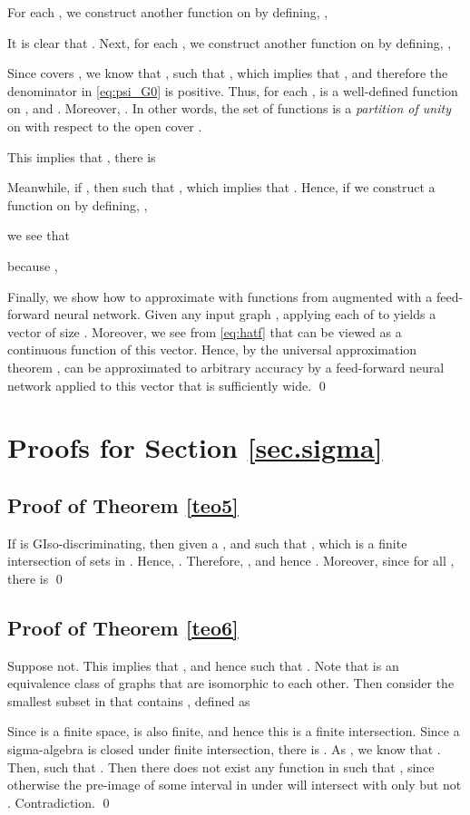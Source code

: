 \documentclass{article}
\begin{document}
For each , we construct another function  on  by defining, ,

It is clear that . Next, for each , we construct another function  on  by defining, ,

Since  covers , we know that ,   such that , which implies that , and therefore the denominator in \eqref{eq:psi_G0} is positive. Thus, for each ,  is a well-defined function on , and . Moreover, . In other words, the set of functions  is a \emph{partition of unity} on  with respect to the open cover .

This implies that , there is

Meanwhile, if , then  such that , which implies that . Hence, if we construct a function  on  by defining, ,

we see that 

because ,


Finally, we show how to approximate  with functions from  augmented with a feed-forward neural network. Given any input graph , applying each of  to  yields a vector of size . Moreover, we see from \eqref{eq:hatf} that  can be viewed as a continuous function of this vector. Hence, by the universal approximation theorem \citep{cybenko1989approximation, hornik1991hornik},  can be approximated to arbitrary accuracy by a feed-forward neural network applied to this vector that is sufficiently wide. \qed

\section{Proofs for Section \ref{sec.sigma}} \label{sec.proofs.reformulating}
\subsection{Proof of Theorem \ref{teo5}}
If  is GIso-discriminating, then given a ,  and  such that , which is a finite intersection  of sets in . Hence, . Therefore, , and hence . Moreover, since  for all , there is 
\qed

\subsection{Proof of Theorem \ref{teo6}}
Suppose not. This implies that , and hence  such that . Note that  is an equivalence class of graphs that are isomorphic to each other. Then consider the smallest subset in  that contains , defined as 

Since  is a finite space,  is also finite, and hence this is a finite intersection. Since a sigma-algebra is closed under finite intersection, there is . As , we know that . Then,  such that . Then there does not exist any function  in  such that , since otherwise the pre-image of some interval in  under  will intersect with only  but not . Contradiction.
\qed
\end{document}
